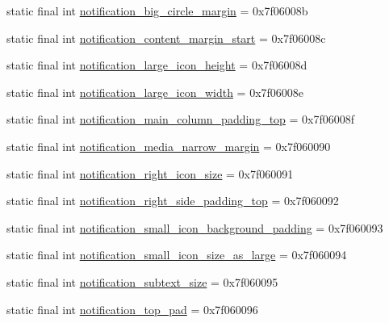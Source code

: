\begin{DoxyCompactItemize}
static final int \mbox{\hyperlink{classandroid_1_1support_1_1design_1_1_r_1_1dimen_a738d4a2e02666e88d0598455b8b03155}{notification\+\_\+big\+\_\+circle\+\_\+margin}} = 0x7f06008b
\item 
static final int \mbox{\hyperlink{classandroid_1_1support_1_1design_1_1_r_1_1dimen_a259c1c7dfe1be9b12cdc164304b90544}{notification\+\_\+content\+\_\+margin\+\_\+start}} = 0x7f06008c
\item 
static final int \mbox{\hyperlink{classandroid_1_1support_1_1design_1_1_r_1_1dimen_a6ad558115ac7ce4e1ce9a38b30aa6034}{notification\+\_\+large\+\_\+icon\+\_\+height}} = 0x7f06008d
\item 
static final int \mbox{\hyperlink{classandroid_1_1support_1_1design_1_1_r_1_1dimen_acdf22e449222145bfdff5402ada49f70}{notification\+\_\+large\+\_\+icon\+\_\+width}} = 0x7f06008e
\item 
static final int \mbox{\hyperlink{classandroid_1_1support_1_1design_1_1_r_1_1dimen_ac0227ecc406f613cbb2ae190720ecfdf}{notification\+\_\+main\+\_\+column\+\_\+padding\+\_\+top}} = 0x7f06008f
\item 
static final int \mbox{\hyperlink{classandroid_1_1support_1_1design_1_1_r_1_1dimen_a136b7bbce4f51c710b6575d246cc798c}{notification\+\_\+media\+\_\+narrow\+\_\+margin}} = 0x7f060090
\item 
static final int \mbox{\hyperlink{classandroid_1_1support_1_1design_1_1_r_1_1dimen_a35a078fbe04b6adbac528c15ee60ab37}{notification\+\_\+right\+\_\+icon\+\_\+size}} = 0x7f060091
\item 
static final int \mbox{\hyperlink{classandroid_1_1support_1_1design_1_1_r_1_1dimen_a62ee45a39a30c78eaa92e7176ed9bc00}{notification\+\_\+right\+\_\+side\+\_\+padding\+\_\+top}} = 0x7f060092
\item 
static final int \mbox{\hyperlink{classandroid_1_1support_1_1design_1_1_r_1_1dimen_a9476590b82f30690f28a1f6078354f2a}{notification\+\_\+small\+\_\+icon\+\_\+background\+\_\+padding}} = 0x7f060093
\item 
static final int \mbox{\hyperlink{classandroid_1_1support_1_1design_1_1_r_1_1dimen_a00d6417836734c756e711909daa5217d}{notification\+\_\+small\+\_\+icon\+\_\+size\+\_\+as\+\_\+large}} = 0x7f060094
\item 
static final int \mbox{\hyperlink{classandroid_1_1support_1_1design_1_1_r_1_1dimen_a971afa031fc61e3559e18f13f8d09792}{notification\+\_\+subtext\+\_\+size}} = 0x7f060095
\item 
static final int \mbox{\hyperlink{classandroid_1_1support_1_1design_1_1_r_1_1dimen_a7fec2b9fa12011362decbbc8c23581d1}{notification\+\_\+top\+\_\+pad}} = 0x7f060096

\end{DoxyCompactItemize}
